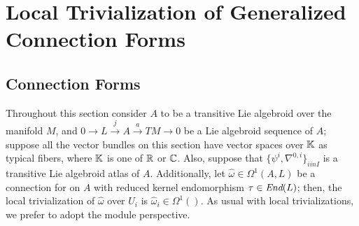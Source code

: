 \section{Local Trivialization of Generalized Connection Forms}
\label{chConnsectTrivializationOfConnections}

\subsection{Connection Forms}
Throughout this section consider $A$ to be a transitive Lie algebroid over the manifold $M$, and $0 \to L \xrightarrow{j} A \xrightarrow{a} TM \to 0$ be a Lie algebroid sequence of $A$; suppose all the vector bundles on this section have vector spaces over $\mathbb{K}$ as typical fibers, where $\mathbb{K}$ is one of $\mathbb{R}$ or $\mathbb{C}$. Also, suppose that $\{\psi^i, \nabla^{0, i}\}_{i in I}$ is a transitive Lie algebroid atlas of $A$. Additionally, let $\hat \omega \in \Omega^1(A, L)$ be a connection for on $A$ with reduced kernel endomorphism $\tau \in \operatorname{\textit{End}}(L)$; then, the local trivialization of $\hat \omega$ over $U_i$ is $\hat \omega_i \in \Omega^1()$. As usual with local trivializations, we prefer to adopt the module perspective.

